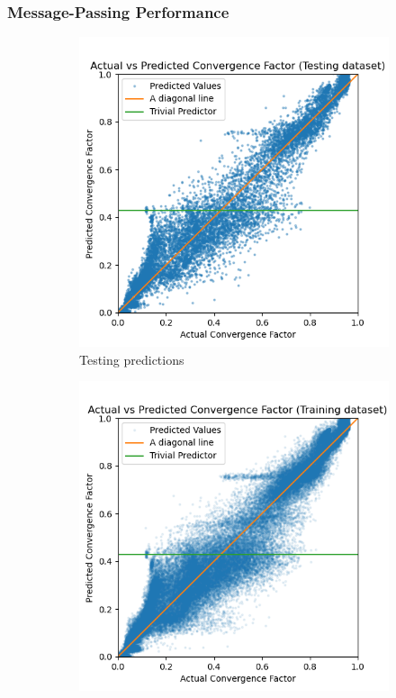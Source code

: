 \documentclass[handout]{beamer}
\begin{document}
\begin{frame}
  \frametitle{Message-Passing Performance}
  \begin{figure}[h]
  \centering
  \begin{subfigure}{.48\textwidth}
    \includegraphics[width=\textwidth]{figures/cd_var_conv_mpnn_test_pred.png}
    \caption{Testing predictions}
    \label{subfig:cd_mpnn_test}
  \end{subfigure}
  \begin{subfigure}{.48\textwidth}
    \includegraphics[width=\textwidth]{figures/cd_var_conv_mpnn_train_pred.png}

\end{subfigure}
\end{figure}
\end{frame}
\end{document}

